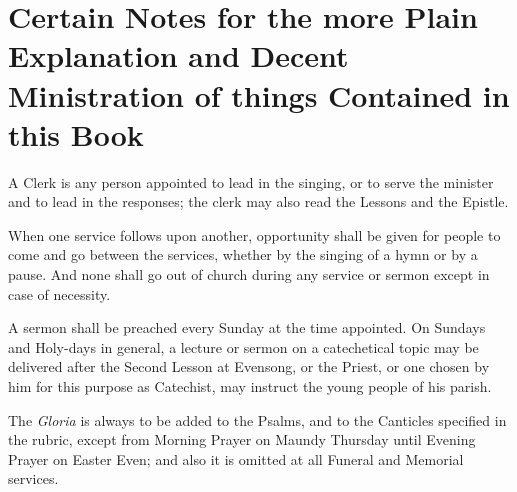 \chapter[Certain Notes]{Certain Notes for the more Plain Explanation and Decent Ministration of things Contained in this Book}





A Clerk is any person appointed to lead in the singing, or to serve the minister and to lead in the responses; the clerk may also read the Lessons and the Epistle.

When one service follows upon another, opportunity shall be given for people to come and go between the services, whether by the singing of a hymn or by a pause. And none shall go out of church during any service or sermon except in case of necessity.

A sermon shall be preached every Sunday at the time appointed. On Sundays and Holy-days in general, a lecture or sermon on a catechetical topic may be delivered after the Second Lesson at Evensong, or the Priest, or one chosen by him for this purpose as Catechist, may instruct the young people of his parish.

The \emph{Gloria} is always to be added to the Psalms, and to the Canticles specified in the rubric, except from Morning Prayer on Maundy Thursday until Evening Prayer on Easter Even; and also it is omitted at all Funeral and Memorial services.

